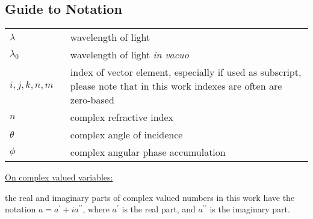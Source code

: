\subsection{Guide to Notation}

\begin{tabular}{p{0.2\linewidth} p{0.8\linewidth}}
$\lambda$ & wavelength of light\\
$\lambda_0$ & wavelength of light \emph{in vacuo} \\
$i, j, k, n, m$ & index of vector element, especially if used as subscript, please note that in this work indexes are often are zero-based \\

$n$ & complex refractive index \\
$\theta$ & complex angle of incidence \\
$\phi$ & complex angular phase accumulation \\
\end{tabular}

\noindent\underline{On complex valued variables:}

the real and imaginary parts of complex valued numbers in this work have the notation $a=a^{\prime}+ia^{\prime\prime}$, where $a^{\prime}$ is the real part, and $a^{\prime\prime}$ is the imaginary part.

